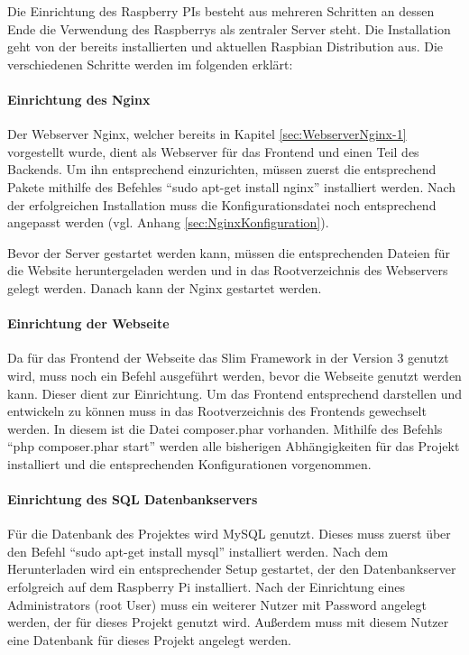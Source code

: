 Die Einrichtung des Raspberry PIs besteht aus mehreren Schritten an dessen Ende die Verwendung des Raspberrys als zentraler Server steht. Die Installation geht von der bereits installierten und aktuellen Raspbian Distribution aus. Die verschiedenen Schritte werden im folgenden erklärt: 
\paragraph{Einrichtung des Nginx} $\;$ \\ 
\label{sec:Einrichtung des Nginx-1} 
Der Webserver Nginx, welcher bereits in Kapitel \ref{sec:WebserverNginx-1} vorgestellt wurde, dient als Webserver für das Frontend und einen Teil des Backends. Um ihn entsprechend einzurichten, müssen zuerst die entsprechend Pakete mithilfe des Befehles ``sudo apt-get install nginx'' installiert werden. Nach der erfolgreichen Installation muss die Konfigurationsdatei noch entsprechend angepasst werden (vgl. Anhang \ref {sec:NginxKonfiguration}). 

Bevor der Server gestartet werden kann, müssen die entsprechenden Dateien für die Website heruntergeladen werden und in das Rootverzeichnis des Webservers gelegt werden. Danach kann der Nginx gestartet werden. 

\paragraph{Einrichtung der Webseite} $\;$ \\ 
\label{sec:EinrichtungderWebseite} 
Da für das Frontend der Webseite das Slim Framework in der Version 3 genutzt wird, muss noch ein Befehl ausgeführt werden, bevor die Webseite genutzt werden kann. Dieser dient zur Einrichtung. Um das Frontend entsprechend darstellen und entwickeln zu können muss in das Rootverzeichnis des Frontends gewechselt werden. In diesem ist die Datei composer.phar vorhanden. Mithilfe des Befehls ``php composer.phar start'' werden alle bisherigen Abhängigkeiten für das Projekt installiert und die entsprechenden Konfigurationen vorgenommen.

\paragraph{Einrichtung des SQL Datenbankservers}$\;$ \\
\label{sec:Einrichtung des SQL Datenbankservers-1} 
Für die Datenbank des Projektes wird MySQL genutzt. Dieses muss zuerst über den Befehl ``sudo apt-get install mysql'' installiert werden. Nach dem Herunterladen wird ein entsprechender Setup gestartet, der den Datenbankserver erfolgreich auf dem Raspberry Pi installiert. Nach der Einrichtung eines Administrators (root User) muss ein weiterer Nutzer mit Password angelegt werden, der für dieses Projekt genutzt wird. Außerdem muss mit diesem Nutzer eine Datenbank für dieses Projekt angelegt werden.


